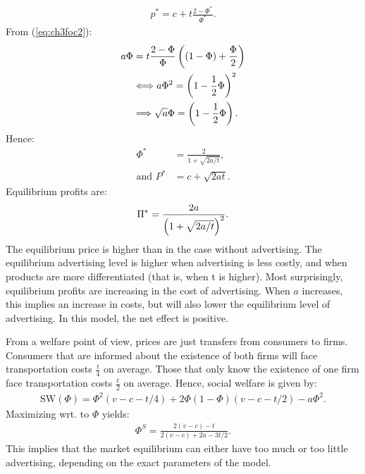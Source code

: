 \begin{align}
	p^*=c+t\frac{2-\Phi^*}{\Phi^*}.
\end{align}
From (\ref{eq:ch3foc2}):
\begin{align}
	a\Phi & =t\frac{2-\Phi}{\Phi}\left((1-\Phi)+\frac{\Phi}{2}\right)     \\
	      & \Longleftrightarrow  a\Phi^2=\left(1-\frac{1}{2}\Phi\right)^2 \\
	      & \Longrightarrow \sqrt{a}\Phi=\left(1-\frac{1}{2}\Phi\right).
\end{align}
Hence:
\begin{align}
	\Phi^*         & =\frac{2}{1+\sqrt{2a/t}}, \\
	\text{and }P^* & =c+\sqrt{2at}.
\end{align}
Equilibrium profits are:
\begin{align}
	\Pi^*=\frac{2a}{\left(1+\sqrt{2a/t}\right)^2}.
\end{align}
The equilibrium price is higher than in the case without advertising.
The equilibrium advertising level is higher when advertising is less costly, and when
products are more differentiated (that is, when t is higher). Most surprisingly, equilibrium
profits are increasing in the cost of advertising. When $a$ increases, this implies an increase
in costs, but will also lower the equilibrium level of advertising. In this model, the net
effect is positive.

From a welfare point of view, prices are just transfers from consumers to firms. Consumers that are informed about the existence of both firms will
face transportation costs $\frac{t}{4}$ on average. Those that only know the existence of one firm face transportation costs $\frac{t}{2}$
on average. Hence, social welfare is given by:
\begin{align}
	\text{SW}(\Phi)=\Phi^2(v-c-t/4)+2\Phi(1-\Phi)(v-c-t/2)-a\Phi^2.
\end{align}
Maximizing wrt. to $\Phi$ yields:
\begin{align}
	\Phi^S=\frac{2(v-c)-t}{2(v-c)+2a-3t/2}.
\end{align}
This implies that the market equilibrium can either have too much or too little advertising,
depending on the exact parameters of the model.
